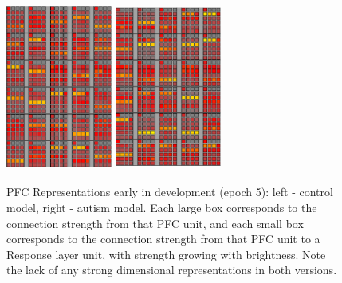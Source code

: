 \documentclass[man]{apa}
\begin{document}
\begin{figure}[t]
\begin{center}
	\includegraphics[width=35mm,height=55mm]{graphs/PFCwts1.05.eps}
	\hspace{18 mm}
	\includegraphics[width=35mm,height=55mm]{graphs/PFCwts54.05.eps}
\end{center}
\caption{PFC Representations early in development
         (epoch 5): left - control model, right -
         autism model.  Each large box corresponds to the connection strength from that PFC unit, and each small box corresponds to the connection strength from that PFC unit to a Response layer unit, with strength growing with brightness.  Note the lack of any strong dimensional representations in both versions.}
\label{rep1-figure}
\end{figure} 
\end{document}
